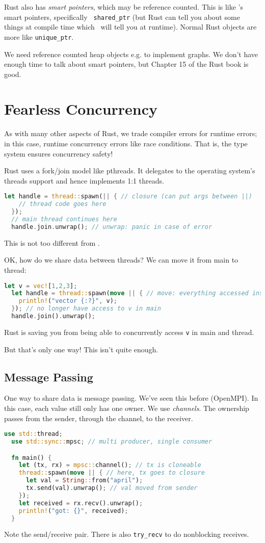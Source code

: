 Rust also has \emph{smart pointers}, which may be reference
counted. This is like \CPP's smart pointers, specifically {\tt
  shared\_ptr} (but Rust can tell you about some things at compile
time which \CPP~will tell you at runtime). Normal Rust objects are more
like {\tt unique\_ptr}.

We need reference counted heap objects e.g. to implement graphs. We don't have
enough time to talk about smart pointers, but Chapter 15 of the Rust book is good.

\section*{Fearless Concurrency}
As with many other aspects of Rust, we trade compiler errors for runtime
errors; in this case, runtime concurrency errors like race conditions.
That is, the type system ensures concurrency safety!

Rust uses a fork/join model like pthreads. It delegates to the operating
system's threads support and hence implements 1:1 threads.
\begin{lstlisting}[language=Rust]
  let handle = thread::spawn(|| { // closure (can put args between ||)
    // thread code goes here
  });
  // main thread continues here
  handle.join.unwrap(); // unwrap: panic in case of error
\end{lstlisting}
This is not too different from \CPP.

OK, how do we share data between threads? We can move it from main to thread:
\begin{lstlisting}[language=Rust]
  let v = vec![1,2,3];
  let handle = thread::spawn(move || { // move: everything accessed inside closure is moved
    println!("vector {:?}", v);
  }); // no longer have access to v in main
  handle.join().unwrap();
\end{lstlisting}
Rust is saving you from being able to concurrently access {\tt v} in main and thread.

But that's only one way! This isn't quite enough.

\subsection*{Message Passing}
One way to share data is message passing. We've seen this before (OpenMPI).
In this case, each value still only has one owner. We use \emph{channels}. The ownership passes
from the sender, through the channel, to the receiver.
\begin{lstlisting}[language=Rust]
  use std::thread;
  use std::sync::mpsc; // multi producer, single consumer

  fn main() {
    let (tx, rx) = mpsc::channel(); // tx is cloneable
    thread::spawn(move || { // here, tx goes to closure
      let val = String::from("april");
      tx.send(val).unwrap(); // val moved from sender
    });
    let received = rx.recv().unwrap();
    println!("got: {}", received);
  }
\end{lstlisting}
Note the send/receive pair. There is also {\tt try\_recv} to do nonblocking receives.

